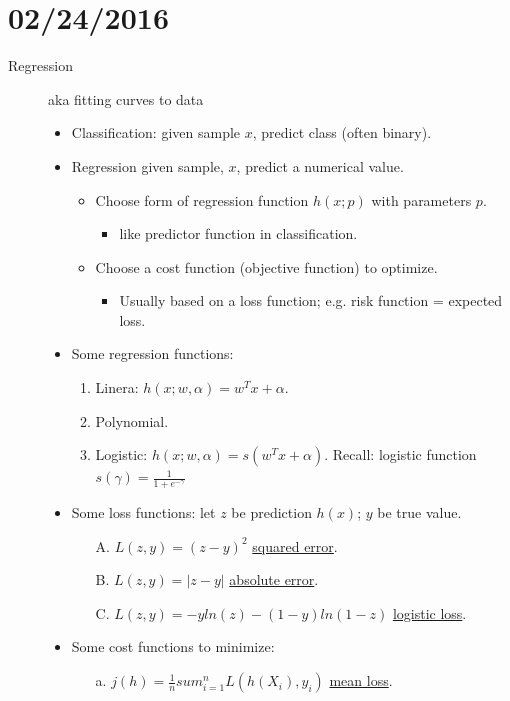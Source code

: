\documentclass[10pt]{article}
\begin{document}
\section*{02/24/2016}
\begin{description}
	\item[Regression] aka fitting curves to data
	\begin{itemize}
		\item Classification: given sample $x$, predict class (often binary).
		\item Regression given sample, $x$, predict a numerical value.
		\begin{itemize}
			\item Choose form of regression function $h(x;p)$ with parameters $p$.
			\begin{itemize}
				\item like predictor function in classification.
			\end{itemize}
			\item Choose a cost function (objective function) to optimize.
			\begin{itemize}
				\item Usually based on a loss function; e.g. risk function = expected loss.
			\end{itemize}
		\end{itemize}
		\item Some regression functions:
			\begin{enumerate}
				\item Linera: $h(x; w, \alpha) = w^{T}x + \alpha$.
				\item Polynomial.
				\item Logistic: $h(x; w, \alpha) = s(w^{T}x + \alpha)$. Recall: logistic function $s(\gamma) = \frac{1}{1 + e^{-\gamma}}$
			\end{enumerate}
		\item Some loss functions: let $z$ be prediction $h(x)$; $y$ be true value.
			\begin{enumerate}
				\item[A.] $L(z, y) = (z-y)^{2}$ \underline{squared error}.
				\item[B.] $L(z, y) = |z-y|$ \underline{absolute error}.
				\item[C.] $L(z, y) = -yln(z)-(1-y)ln(1-z)$ \underline{logistic loss}.
			\end{enumerate}
		\item Some cost functions to minimize:
			\begin{enumerate}
				\item[a.] $j(h) = \frac{1}{n}sum_{i=1}^{n}L(h(X_{i}),y_{i})$ \underline{mean loss}.

\end{enumerate}
\end{itemize}
\end{description}
\end{document}

